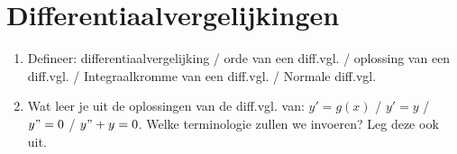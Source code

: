 \documentclass[12pt]{article}
\begin{document}
    \maketitle

    \section{Differentiaalvergelijkingen}
    \begin{enumerate}
        \item Defineer: differentiaalvergelijking / orde van een diff.vgl. / oplossing van een diff.vgl. / Integraalkromme van een diff.vgl. / Normale diff.vgl.
        \item Wat leer je uit de oplossingen van de diff.vgl. van: $y'=g(x)$ / $y'=y$ / $y"=0$ / $y"+y=0$. Welke terminologie zullen we invoeren? Leg deze ook uit.
    \end{enumerate}
    
\end{document}
